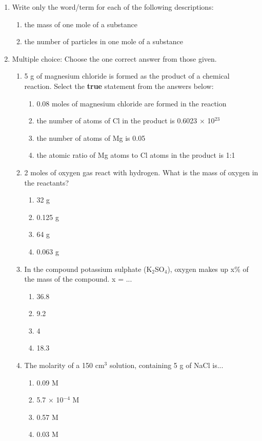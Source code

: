 \begin{eocexercises}{}
\begin{enumerate}
\item{Write only the word/term for each of the following descriptions:}
\begin{enumerate}
\item{the mass of one mole of a substance}
\item{the number of particles in one mole of a substance}
\end{enumerate}

\item{Multiple choice: Choose the one correct answer from those given.}
\renewcommand{\labelenumii}{\Alph{enumii}}

\begin{enumerate}
\item{5 g of magnesium chloride is formed as the product of a chemical reaction. Select the \textbf{true} statement from the answers below:}
\begin{enumerate}
\item{0.08 moles of magnesium chloride are formed in the reaction}
\item{the number of atoms of Cl in the product is 0.6023 $\times$ 10$^{23}$}
\item{the number of atoms of Mg is 0.05}
\item{the atomic ratio of Mg atoms to Cl atoms in the product is 1:1}
\end{enumerate}

\item{2 moles of oxygen gas react with hydrogen. What is the mass of oxygen in the reactants?}
\begin{enumerate}
\item{32 g}
\item{0.125 g}
\item{64 g}
\item{0.063 g}
\end{enumerate}

\item{In the compound potassium sulphate (K$_{2}$SO$_{4}$), oxygen makes up x\% of the mass of the compound. x = ...}
\begin{enumerate}
\item{36.8}
\item{9.2}
\item{4}
\item{18.3}
\end{enumerate}

\item{The molarity of a 150 cm$^{3}$ solution, containing 5 g of NaCl is...}
\begin{enumerate}
\item{0.09 M}
\item{5.7 $\times$ 10$^{-4}$ M}
\item{0.57 M}
\item{0.03 M}
\end{enumerate}
\end{enumerate}
\renewcommand{\labelenumii}{\alph{enumii}}


\end{enumerate}
\end{eocexercises}
